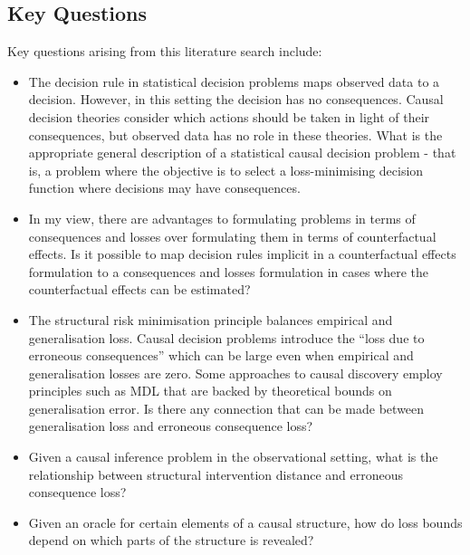 
\subsection{Key Questions}

Key questions arising from this literature search include:

\begin{itemize}
    \item The decision rule in statistical decision problems maps observed data to a decision. However, in this setting the decision has no consequences. Causal decision theories consider which actions should be taken in light of their consequences, but observed data has no role in these theories. What is the appropriate general description of a statistical causal decision problem - that is, a problem where the objective is to select a loss-minimising decision function where decisions may have consequences.
    \item In my view, there are advantages to formulating problems in terms of consequences and losses over formulating them in terms of counterfactual effects. Is it possible to map decision rules implicit in a counterfactual effects formulation to a consequences and losses formulation in cases where the counterfactual effects can be estimated?
    \item The structural risk minimisation principle balances empirical and generalisation loss. Causal decision problems introduce the ``loss due to erroneous consequences'' which can be large even when empirical and generalisation losses are zero. Some approaches to causal discovery employ principles such as MDL that are backed by theoretical bounds on generalisation error. Is there any connection that can be made between generalisation loss and erroneous consequence loss?
    \item Given a causal inference problem in the observational setting, what is the relationship between structural intervention distance and erroneous consequence loss?
    \item Given an oracle for certain elements of a causal structure, how do loss bounds depend on which parts of the structure is revealed?
\end{itemize}